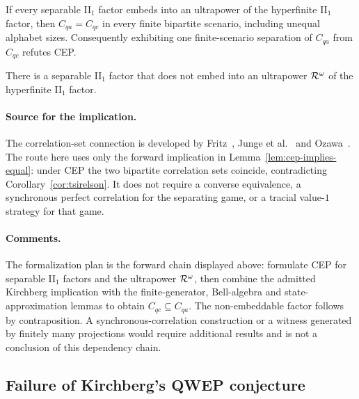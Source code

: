 \begin{lemma}
\label{lem:cep-implies-equal}
If every separable II$_1$ factor embeds into an ultrapower of the hyperfinite II$_1$ factor,
then $C_{qa} = C_{qc}$ in every finite bipartite scenario, including unequal alphabet sizes.
Consequently exhibiting one finite-scenario separation of $C_{qa}$ from $C_{qc}$ refutes CEP.
\end{lemma}

\begin{corollary}
\label{cor:cep}
There is a separable II$_1$ factor that does not embed into an ultrapower
$\cal{R}^{\omega}$ of the hyperfinite II$_1$ factor.
\end{corollary}

\paragraph{Source for the implication.} The correlation-set connection is developed by
Fritz~\cite{Fri12}, Junge et al.~\cite{JNPPSW11} and Ozawa~\cite{Oza13}. The route here
uses only the forward implication in Lemma~\ref{lem:cep-implies-equal}: under CEP the
two bipartite correlation sets coincide, contradicting Corollary~\ref{cor:tsirelson}.
It does not require a converse equivalence, a synchronous perfect correlation for the
separating game, or a tracial value-$1$ strategy for that game.

\paragraph{Comments.} The formalization plan is the forward chain displayed above:
formulate CEP for separable II$_1$ factors and the ultrapower $\cal{R}^\omega$, then
combine the admitted Kirchberg implication with the finite-generator, Bell-algebra and
state-approximation lemmas to obtain $C_{qc}\subseteq C_{qa}$. The non-embeddable factor
follows by contraposition. A synchronous-correlation construction or a witness generated
by finitely many projections would require additional results and is not a conclusion of
this dependency chain.

\subsection{Failure of Kirchberg's QWEP conjecture}

